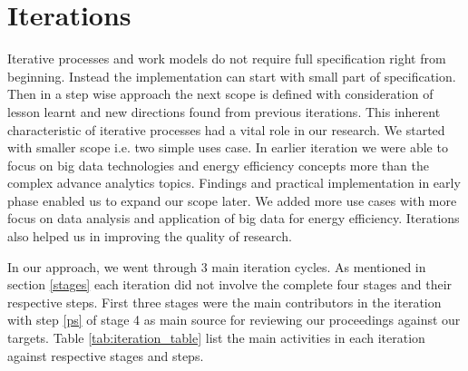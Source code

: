 \section{Iterations} \label{iteration}
Iterative processes and work models do not require full specification right from beginning. Instead the implementation can start with small part of specification. Then in a step wise approach the next scope is defined with consideration of lesson learnt and new directions found from previous iterations. This inherent characteristic of iterative processes had a vital role in our research. We started with smaller scope i.e. two simple uses case. In earlier iteration we were able to focus on big data technologies and energy efficiency concepts more than the complex advance analytics topics. Findings and practical implementation in early phase enabled us to expand our scope later. We added more use cases with more focus on data analysis and application of big data for energy efficiency. Iterations also helped us in improving the quality of research. 

In our approach, we went through 3 main iteration cycles. As mentioned in section \ref{stages} each iteration did not involve the complete four stages and their respective steps. First three stages were the main contributors in the iteration with step \ref{ps} of stage 4 as main source for reviewing our proceedings against our targets. Table \ref{tab:iteration_table} list the main activities in each iteration against respective stages and steps.    

